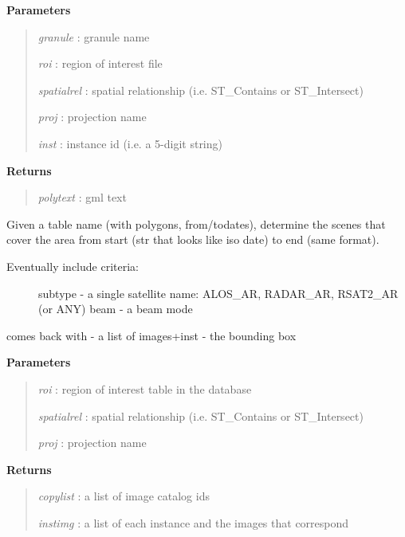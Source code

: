 \documentclass[letterpaper,10pt,english]{sphinxmanual}
\begin{document}
\begin{fulllineitems}
\begin{fulllineitems}
\textbf{Parameters}
\begin{quote}

\emph{granule}    : granule name

\emph{roi}        : region of interest file

\emph{spatialrel} : spatial relationship (i.e. ST\_Contains or ST\_Intersect)

\emph{proj}       : projection name

\emph{inst}       : instance id (i.e. a 5-digit string)
\end{quote}

\textbf{Returns}
\begin{quote}

\emph{polytext}  :   gml text
\end{quote}

\end{fulllineitems}


\begin{fulllineitems}
\label{code:Database.Database.qrySelectFromArchive}
Given a table name (with polygons, from/todates), determine the scenes that cover the area
from start (str that looks like iso date) to end (same format).
\begin{description}
\item[{Eventually include criteria:}] \leavevmode
subtype - a single satellite name: ALOS\_AR, RADAR\_AR, RSAT2\_AR (or ANY)        
beam - a beam mode

\end{description}

comes back with - a list of images+inst - the bounding box

\textbf{Parameters}
\begin{quote}

\emph{roi}        : region of interest table in the database

\emph{spatialrel} : spatial relationship (i.e. ST\_Contains or ST\_Intersect)

\emph{proj}       : projection name
\end{quote}

\textbf{Returns}
\begin{quote}

\emph{copylist} : a list of image catalog ids

\emph{instimg}  : a list of each instance and the images that correspond
\end{quote}


\end{fulllineitems}
\end{fulllineitems}
\end{document}
